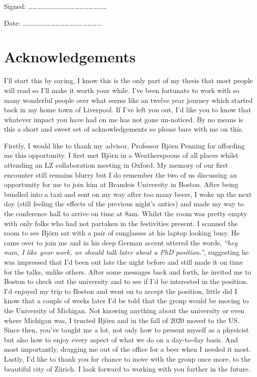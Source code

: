 \documentclass[a4paper,11pt,usegeometry]{scrreprt} %
\begin{document}
Signed:
……………………………………………
\bigskip

Date:
……………………………………………

\newpage\null\thispagestyle{empty}\newpage
\chapter*{Acknowledgements}
I'll start this by saying, I know this is the only part of my thesis that most people will read so I'll make it worth your while. I've been fortunate to work with so many wonderful people over what seems like an twelve year journey which started back in my home town of Liverpool. If I've left you out, I'd like you to know that whatever impact you have had on me has not gone un-noticed. By no means is this a short and sweet set of acknowledgements so please bare with me on this.

Firstly, I would like to thank my advisor, Professor Bj\"orn Penning for affording me this opportunity. I first met Bj\"orn in a Weatherspoons of all places whilst attending an LZ collaboration meeting in Oxford. My memory of our first encounter still remains blurry but I do remember the two of us discussing an opportunity for me to join him at Brandeis University in Boston. After being bundled into a taxi and sent on my way after too many beers, I woke up the next day (still feeling the effects of the previous night's antics) and made my way to the conference hall to arrive on time at 8am. Whilst the room was pretty empty with only folks who had not partaken in the festivities present. I scanned the room to see Bj\"orn sat with a pair of sunglasses at his laptop looking busy. He came over to join me and in his deep German accent uttered the words, \textit{``hey man, I like your work, we should talk later about a PhD position.''}, suggesting he was impressed that I'd been out late the night before and still made it on time for the talks, unlike others. After some messages back and forth, he invited me to Boston to check out the university and to see if I'd be interested in the position. I'd enjoyed my trip to Boston and went on to accept the position, little did I know that a couple of weeks later I'd be told that the group would be moving to the University of Michigan. Not knowing anything about the university or even where Michigan was, I trusted Bj\"orn and in the fall of 2020 moved to the US. Since then, you've taught me a lot, not only how to present myself as a physicist but also how to enjoy every aspect of what we do on a day-to-day basis. And most importantly, dragging me out of the office for a beer when I needed it most. Lastly, I'd like to thank you for chance to move with the group once more, to the beautiful city of Z\"urich. I look forward to working with you further in the future.
\end{document}
